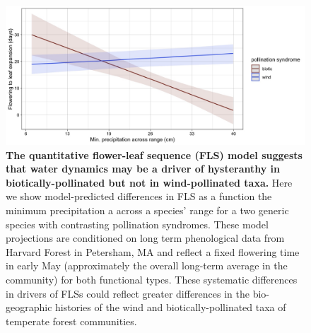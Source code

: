 \documentclass[11pt]{article}
\begin{document}
 \begin{figure}[h!] 
        \centering
          \includegraphics[width=\textwidth]{..//HarvardForest/apcs.jpeg}
           \caption{\textbf{The quantitative flower-leaf sequence (FLS) model suggests that water dynamics may be a driver of hysteranthy in biotically-pollinated but not in wind-pollinated taxa.} Here we show model-predicted differences in FLS as a function the minimum precipitation a across a species' range for a two generic species with contrasting pollination syndromes. These model projections are conditioned on long term phenological data from Harvard Forest in Petersham, MA \citep{OKeefe2015} and reflect a fixed flowering time in early May (approximately the overall long-term average in the community) for both functional types. These systematic differences in drivers of FLSs could reflect greater differences in the bio-geographic histories of the wind and biotically-pollinated taxa of temperate forest communities.}
        \label{fig:apcs}
    \end{figure}


    
\end{document}
